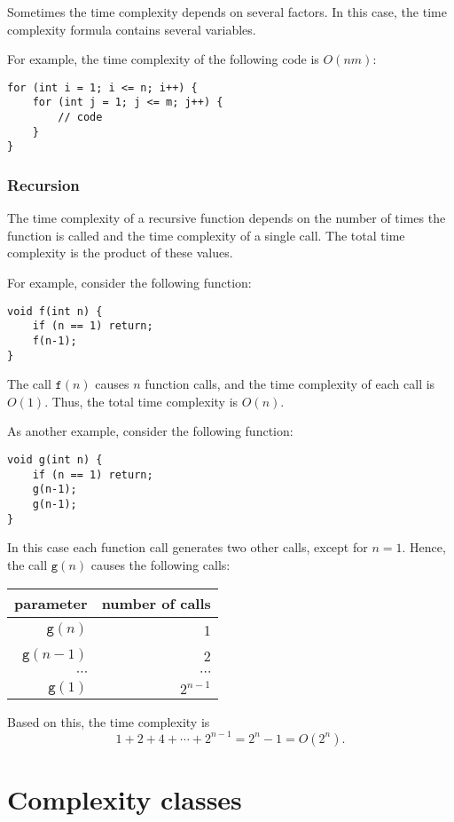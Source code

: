 Sometimes the time complexity depends on
several factors.
In this case, the time complexity formula
contains several variables.

For example, the time complexity of the
following code is $O(nm)$:

\begin{lstlisting}
for (int i = 1; i <= n; i++) {
    for (int j = 1; j <= m; j++) {
        // code
    }
}
\end{lstlisting}

\subsubsection*{Recursion}

The time complexity of a recursive function
depends on the number of times the function is called
and the time complexity of a single call.
The total time complexity is the product of
these values.

For example, consider the following function:
\begin{lstlisting}
void f(int n) {
    if (n == 1) return;
    f(n-1);
}
\end{lstlisting}
The call $\texttt{f}(n)$ causes $n$ function calls,
and the time complexity of each call is $O(1)$.
Thus, the total time complexity is $O(n)$.

As another example, consider the following function:
\begin{lstlisting}
void g(int n) {
    if (n == 1) return;
    g(n-1);
    g(n-1);
}
\end{lstlisting}
In this case each function call generates two other
calls, except for $n=1$.
Hence, the call $\texttt{g}(n)$ causes the following calls:
\begin{center}
\begin{tabular}{rr}
parameter & number of calls \\
\hline
$\texttt{g}(n)$ & 1 \\
$\texttt{g}(n-1)$ & 2 \\
$\cdots$ & $\cdots$ \\
$\texttt{g}(1)$ & $2^{n-1}$ \\
\end{tabular}
\end{center}
Based on this, the time complexity is
\[1+2+4+\cdots+2^{n-1} = 2^n-1 = O(2^n).\]

\section{Complexity classes}

